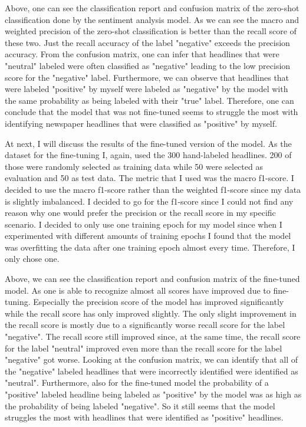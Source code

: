 \documentclass[11pt, a4paper, leqno]{article}
\begin{document}




Above, one can see the classification report and confusion matrix of the zero-shot classification done by the sentiment analysis model. As we can see the macro and weighted precision of the zero-shot classification is better than the recall score of these two. Just the recall accuracy of the label "negative" exceeds the precision accuracy. From the confusion matrix, one can infer that headlines that were "neutral" labeled were often classified as "negative" leading to the low precision score for the "negative" label. Furthermore, we can observe that headlines that were labeled "positive" by myself were labeled as "negative" by the model with the same probability as being labeled with their "true" label. Therefore, one can conclude that the model that was not fine-tuned seems to struggle the most with identifying newspaper headlines that were classified as "positive" by myself.

At next, I will discuss the results of the fine-tuned version of the model. As the dataset for the fine-tuning I, again, used the 300 hand-labeled headlines. 200 of those were randomly selected as training data while 50 were selected as evaluation and 50 as test data. The metric that I used was the macro f1-score. I decided to use the macro f1-score rather than the weighted f1-score since my data is slightly imbalanced. I decided to go for the f1-score since I could not find any reason why one would prefer the precision or the recall score in my specific scenario.
I decided to only use one training epoch for my model since when I experimented with different amounts of training epochs I found that the model was overfitting the data after one training epoch almost every time. Therefore, I only chose one.





Above, we can see the classification report and confusion matrix of the fine-tuned model. As one is able to recognize almost all scores have improved due to fine-tuning. Especially the precision score of the model has improved significantly while the recall score has only improved slightly. The only slight improvement in the recall score is mostly due to a significantly worse recall score for the label "negative". The recall score still improved since, at the same time, the recall score for the label "neutral" improved even more than the recall score for the label "negative" got worse.
Looking at the confusion matrix, we can identify that all of the "negative" labeled headlines that were incorrectly identified were identified as "neutral". Furthermore, also for the fine-tuned model the probability of a "positive" labeled headline being labeled as "positive" by the model was as high as the probability of being labeled "negative". So it still seems that the model struggles the most with headlines that were identified as "positive" headlines.
\end{document}
